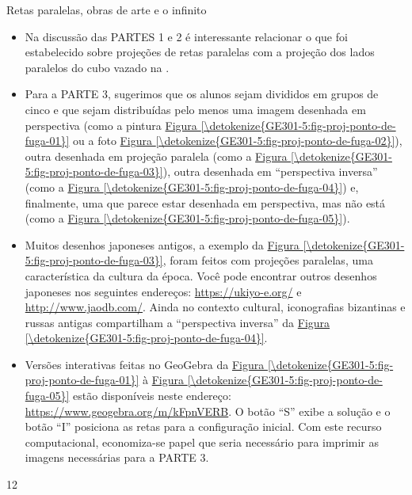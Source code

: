 \begin{sugestions}{Retas paralelas, obras de arte e o infinito}
{
\begin{itemize}
\item {} 
Na discussão das PARTES 1 e 2 é interessante relacionar o que foi estabelecido sobre projeções de retas paralelas com a projeção dos lados paralelos do cubo vazado na .

\item {} 
Para a PARTE 3, sugerimos que os alunos sejam divididos em grupos de cinco e que sejam distribuídas pelo menos uma imagem desenhada em perspectiva (como a pintura \hyperref[\detokenize{GE301-5:fig-proj-ponto-de-fuga-01}]{Figura \ref{\detokenize{GE301-5:fig-proj-ponto-de-fuga-01}}} ou a foto \hyperref[\detokenize{GE301-5:fig-proj-ponto-de-fuga-02}]{Figura \ref{\detokenize{GE301-5:fig-proj-ponto-de-fuga-02}}}), outra desenhada em projeção paralela (como a \hyperref[\detokenize{GE301-5:fig-proj-ponto-de-fuga-03}]{Figura \ref{\detokenize{GE301-5:fig-proj-ponto-de-fuga-03}}}), outra desenhada em “perspectiva inversa” (como a \hyperref[\detokenize{GE301-5:fig-proj-ponto-de-fuga-04}]{Figura \ref{\detokenize{GE301-5:fig-proj-ponto-de-fuga-04}}}) e, finalmente, uma que parece estar desenhada em perspectiva, mas não está  (como a \hyperref[\detokenize{GE301-5:fig-proj-ponto-de-fuga-05}]{Figura \ref{\detokenize{GE301-5:fig-proj-ponto-de-fuga-05}}}).

\item {} 
Muitos desenhos japoneses antigos, a exemplo da \hyperref[\detokenize{GE301-5:fig-proj-ponto-de-fuga-03}]{Figura \ref{\detokenize{GE301-5:fig-proj-ponto-de-fuga-03}}}, foram feitos com projeções paralelas, uma característica da cultura da época. Você pode encontrar outros desenhos japoneses nos seguintes endereços: \url{https://ukiyo-e.org/} e \url{http://www.jaodb.com/}. Ainda no contexto cultural, iconografias bizantinas e russas antigas compartilham a “perspectiva inversa” da \hyperref[\detokenize{GE301-5:fig-proj-ponto-de-fuga-04}]{Figura \ref{\detokenize{GE301-5:fig-proj-ponto-de-fuga-04}}}.

\item {} 
Versões interativas feitas no GeoGebra da \hyperref[\detokenize{GE301-5:fig-proj-ponto-de-fuga-01}]{Figura \ref{\detokenize{GE301-5:fig-proj-ponto-de-fuga-01}}} à \hyperref[\detokenize{GE301-5:fig-proj-ponto-de-fuga-05}]{Figura \ref{\detokenize{GE301-5:fig-proj-ponto-de-fuga-05}}} estão disponíveis neste endereço: \url{https://www.geogebra.org/m/kFpnVERB}. O botão “S” exibe a solução e o botão “I” posiciona as retas para a configuração inicial. Com este recurso computacional, economiza-se papel que seria necessário para imprimir as imagens necessárias para a PARTE 3.
\end{itemize}
}{1}{2}
\end{sugestions}

